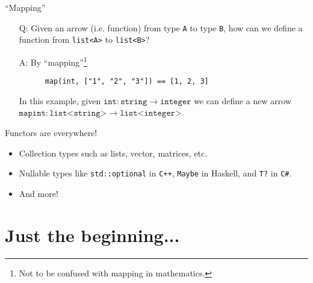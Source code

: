 \documentclass[10pt]{beamer}
\begin{document}
\begin{frame}[fragile]{``Mapping''}
  \begin{enumerate}[<+- | alert@+>]
  \item[Q:] Given an arrow (i.e. function) from type \texttt{A} to type \texttt{B}, how can we define a function from \texttt{list<A>} to \texttt{list<B>}?
  \item[A:] By ``mapping''\footnote{Not to be confused with mapping in mathematics.}

    \begin{lstlisting}
      map(int, ["1", "2", "3"]) == [1, 2, 3]
    \end{lstlisting}
  In this example, given \(\texttt{int} : \texttt{string} \to \texttt{integer}\) we can define a new arrow \(\texttt{mapint} : \texttt{list<string>} \to \texttt{list<integer>}\).
  \end{enumerate}
\end{frame}

\begin{frame}{Functors are everywhere!}
  \begin{itemize}
  \item Collection types such as lists, vector, matrices, etc.
  \item Nullable types like \texttt{std::optional} in \texttt{C++}, \texttt{Maybe} in Haskell, and \texttt{T?} in \texttt{C\#}.
  \item And more!
  \end{itemize}
\end{frame}

\section{Just the beginning...}
\end{document}

